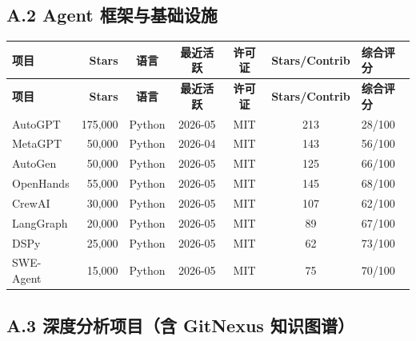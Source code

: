 \subsection*{A.2 Agent 框架与基础设施}

\begin{longtable}{p{2.8cm}rccccp{2.5cm}}
\toprule
\textbf{项目} & \textbf{Stars} & \textbf{语言} & \textbf{最近活跃} & \textbf{许可证} & \textbf{Stars/Contrib} & \textbf{综合评分} \\
\midrule
\endfirsthead
\toprule
\textbf{项目} & \textbf{Stars} & \textbf{语言} & \textbf{最近活跃} & \textbf{许可证} & \textbf{Stars/Contrib} & \textbf{综合评分} \\
\midrule
\endhead
\bottomrule
\endlastfoot

AutoGPT & 175,000 & Python & 2026-05 & MIT & 213 & 28/100 \\
MetaGPT & 50,000 & Python & 2026-04 & MIT & 143 & 56/100 \\
AutoGen & 50,000 & Python & 2026-05 & MIT & 125 & 66/100 \\
OpenHands & 55,000 & Python & 2026-05 & MIT & 145 & 68/100 \\
CrewAI & 30,000 & Python & 2026-05 & MIT & 107 & 62/100 \\
LangGraph & 20,000 & Python & 2026-05 & MIT & 89 & 67/100 \\
DSPy & 25,000 & Python & 2026-05 & MIT & 62 & 73/100 \\
SWE-Agent & 15,000 & Python & 2026-05 & MIT & 75 & 70/100 \\
\end{longtable}

\subsection*{A.3 深度分析项目（含 GitNexus 知识图谱）}

